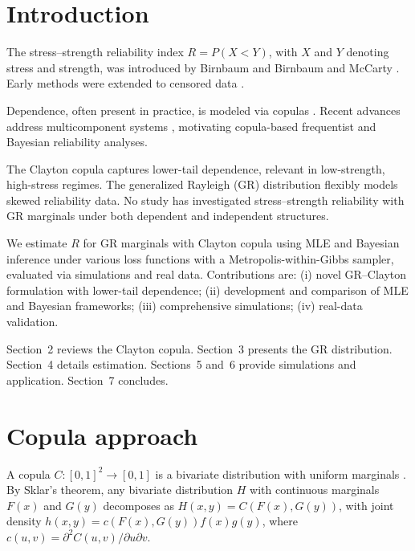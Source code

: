 \documentclass[twoside]{article}
\begin{document}
\section{Introduction}

The stress--strength reliability index \(R = P(X < Y)\), with \(X\) and \(Y\) denoting stress and strength, was introduced by Birnbaum \cite{Birnbaum1956} and Birnbaum and McCarty \cite{Birnbaum1958}. Early methods \cite{Mazumdar1970} were extended to censored data \cite{Valiollahi2013,Basirat2015}.

Dependence, often present in practice, is modeled via copulas \cite{Nelsen2006}. Recent advances address multicomponent systems \cite{Wang2024,Zhang2025,Akgul2025,WangYan2025,ZhangYan2025,Cai2023,Alshehri2026}, motivating copula-based frequentist and Bayesian reliability analyses.

The Clayton copula captures lower-tail dependence, relevant in low-strength, high-stress regimes. The generalized Rayleigh (GR) distribution flexibly models skewed reliability data. No study has investigated stress--strength reliability with GR marginals under both dependent and independent structures.

We estimate $R$ for GR marginals with Clayton copula using MLE and Bayesian inference under various loss functions with a Metropolis-within-Gibbs sampler, evaluated via simulations and real data. Contributions are: (i) novel GR--Clayton formulation with lower-tail dependence; (ii) development and comparison of MLE and Bayesian frameworks; (iii) comprehensive simulations; (iv) real-data validation.

Section~2 reviews the Clayton copula. Section~3 presents the GR distribution. Section~4 details estimation. Sections~5 and~6 provide simulations and application. Section~7 concludes.

\section{Copula approach}

A copula \( C : [0,1]^2 \rightarrow [0,1] \) is a bivariate distribution with uniform marginals \cite{Sklar1959,Nelsen2006}. By Sklar's theorem, any bivariate distribution \(H\) with continuous marginals \(F(x)\) and \(G(y)\) decomposes as \(H(x, y) = C(F(x), G(y))\), with joint density \(h(x, y) = c(F(x), G(y)) f(x) g(y)\), where \(c(u, v) = \partial^2 C(u, v) / \partial u \partial v\).
\end{document}

